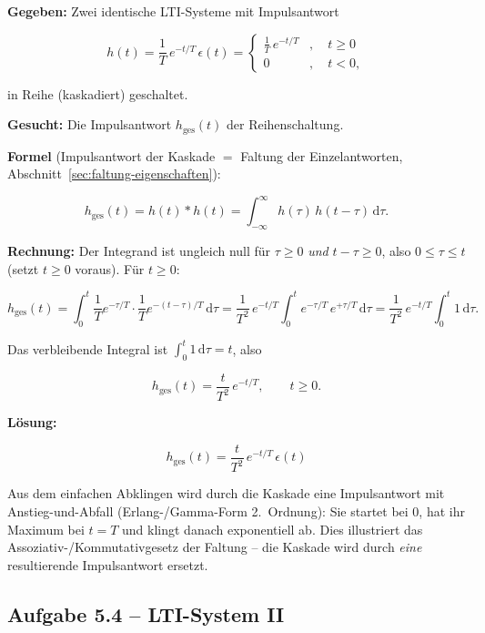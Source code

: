 \begin{beispiel}

\textbf{Gegeben:} Zwei identische LTI-Systeme mit Impulsantwort

$$
h(t) = \frac{1}{T}\, e^{-t/T}\,\epsilon(t)
= \begin{cases} \tfrac{1}{T}\, e^{-t/T} & , \quad t \geq 0 \\[2pt] 0 & , \quad t < 0, \end{cases}
$$

in Reihe (kaskadiert) geschaltet.

\textbf{Gesucht:} Die Impulsantwort $h_{\text{ges}}(t)$ der Reihenschaltung.

\textbf{Formel} (Impulsantwort der Kaskade $=$ Faltung der Einzelantworten,
Abschnitt~\ref{sec:faltung-eigenschaften}):

$$
h_{\text{ges}}(t) = h(t) * h(t)
= \int_{-\infty}^{\infty} h(\tau)\, h(t - \tau)\,\mathrm{d}\tau.
$$

\textbf{Rechnung:} Der Integrand ist ungleich null für $\tau \geq 0$ \emph{und}
$t - \tau \geq 0$, also $0 \leq \tau \leq t$ (setzt $t \geq 0$ voraus). Für
$t \geq 0$:

$$
h_{\text{ges}}(t)
= \int_{0}^{t} \frac{1}{T}e^{-\tau/T}\cdot\frac{1}{T}e^{-(t - \tau)/T}\,\mathrm{d}\tau
= \frac{1}{T^2}\, e^{-t/T}\int_{0}^{t} e^{-\tau/T}\,e^{+\tau/T}\,\mathrm{d}\tau
= \frac{1}{T^2}\, e^{-t/T}\int_{0}^{t} 1\,\mathrm{d}\tau.
$$

Das verbleibende Integral ist $\int_0^t 1\,\mathrm{d}\tau = t$, also

$$
h_{\text{ges}}(t) = \frac{t}{T^2}\, e^{-t/T}, \qquad t \geq 0.
$$

\textbf{Lösung:}

$$
\boxed{\;h_{\text{ges}}(t) = \frac{t}{T^2}\, e^{-t/T}\,\epsilon(t)\;}
$$

Aus dem einfachen Abklingen wird durch die Kaskade eine Impulsantwort mit
Anstieg-und-Abfall (Erlang-/Gamma-Form 2.\ Ordnung): Sie startet bei $0$, hat
ihr Maximum bei $t = T$ und klingt danach exponentiell ab. Dies illustriert das
Assoziativ-/Kommutativgesetz der Faltung -- die Kaskade wird durch \emph{eine}
resultierende Impulsantwort ersetzt.

\end{beispiel}

\subsection*{Aufgabe 5.4 – LTI-System II}

